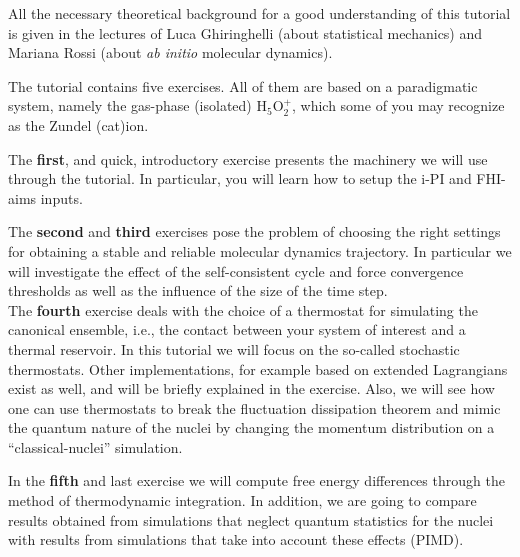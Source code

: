 \documentclass[a4paper,11pt]{scrartcl}
\begin{document}
All the necessary theoretical background for a good understanding of this tutorial is given in the lectures of Luca Ghiringhelli (about statistical mechanics) and Mariana Rossi (about \textit{ab initio} molecular dynamics).

The tutorial contains five exercises. All of them are based on a paradigmatic system, namely the gas-phase (isolated) H$_5$O$_2^+$, which some of you may recognize as the Zundel (cat)ion. 


The \textbf{first}, and quick, introductory exercise presents the machinery we will use through the tutorial. 
In particular, you will learn how to setup the i-PI and FHI-aims inputs.


The \textbf{second} and \textbf{third} exercises pose the problem of choosing the right settings for obtaining a stable and reliable molecular dynamics trajectory.
In particular we will investigate the effect of the self-consistent cycle and force convergence thresholds as well as the influence of the size of the time step. \\

The \textbf{fourth} exercise deals with the choice of a thermostat for simulating the canonical ensemble, i.e., the contact between your system of interest and a thermal reservoir. 
In this tutorial we will focus on the so-called stochastic thermostats. Other implementations, for example based on extended Lagrangians exist as well, and will be briefly explained in the exercise.
Also, we will see how one can use thermostats to break the fluctuation dissipation theorem and mimic the quantum nature of the nuclei by changing the momentum distribution on a ``classical-nuclei'' simulation.


In the  \textbf{fifth} and last exercise we will compute free energy differences through the method of thermodynamic integration. In addition, we are going to compare results obtained from simulations that neglect quantum statistics for the nuclei with results from simulations that take into account these effects (PIMD). 
\end{document}

